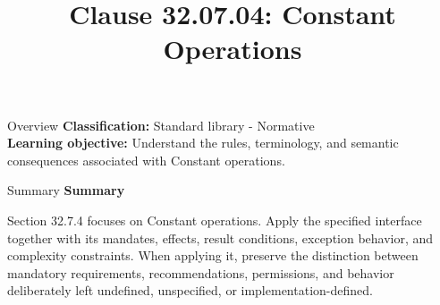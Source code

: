 \documentclass[10pt,letterpaper]{article}
\title{Clause 32.07.04: Constant Operations}
\author{}
\date{}
\begin{document}
\maketitle
\begin{CornellOverviewBox}{Overview}
\textbf{Classification:} Standard library - Normative\\[2pt]
\textbf{Learning objective:} Understand the rules, terminology, and semantic consequences associated with Constant operations.
\end{CornellOverviewBox}\begin{CornellSummaryBox}{Summary}
{\sffamily\bfseries\color{Accent} Summary}\par\vspace{3pt}Section 32.7.4 focuses on Constant operations. Apply the specified interface together with its mandates, effects, result conditions, exception behavior, and complexity constraints. When applying it, preserve the distinction between mandatory requirements, recommendations, permissions, and behavior deliberately left undefined, unspecified, or implementation-defined.
\end{CornellSummaryBox}
\end{document}
